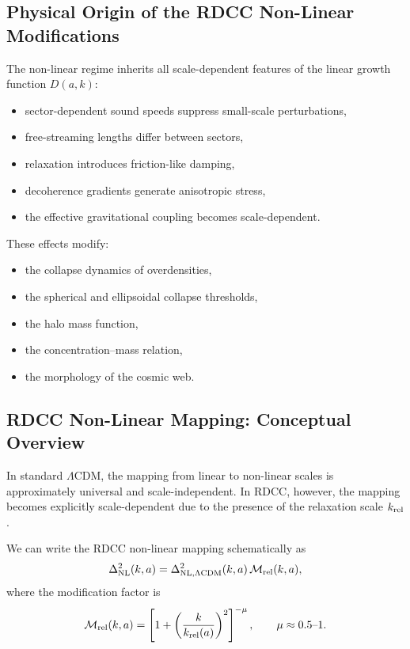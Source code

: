 \documentclass[11pt,a4paper]{article}
\begin{document}
\subsection{Physical Origin of the RDCC Non-Linear Modifications}

The non-linear regime inherits all scale-dependent features of the linear growth function
$D(a,k)$:
\begin{itemize}
\item sector-dependent sound speeds suppress small-scale perturbations,
\item free-streaming lengths differ between sectors,
\item relaxation introduces friction-like damping,
\item decoherence gradients generate anisotropic stress,
\item the effective gravitational coupling becomes scale-dependent.
\end{itemize}

These effects modify:
\begin{itemize}
\item the collapse dynamics of overdensities,
\item the spherical and ellipsoidal collapse thresholds,
\item the halo mass function,
\item the concentration--mass relation,
\item the morphology of the cosmic web.
\end{itemize}

\subsection{RDCC Non-Linear Mapping: Conceptual Overview}

In standard $\Lambda$CDM, the mapping from linear to non-linear scales is approximately
universal and scale-independent. In RDCC, however, the mapping becomes explicitly
scale-dependent due to the presence of the relaxation scale $k_{\rm rel}$.

We can write the RDCC non-linear mapping schematically as
\begin{equation}
\Delta^2_{\rm NL}(k,a)
= \Delta^2_{\rm NL,\Lambda CDM}(k,a)\,
\mathcal{M}_{\rm rel}(k,a),
\end{equation}
where the modification factor is
\begin{equation}
\mathcal{M}_{\rm rel}(k,a)
= \left[1 + \left(\frac{k}{k_{\rm rel}(a)}\right)^2\right]^{-\mu},
\qquad \mu \approx 0.5\text{--}1.
\end{equation}
\end{document}
